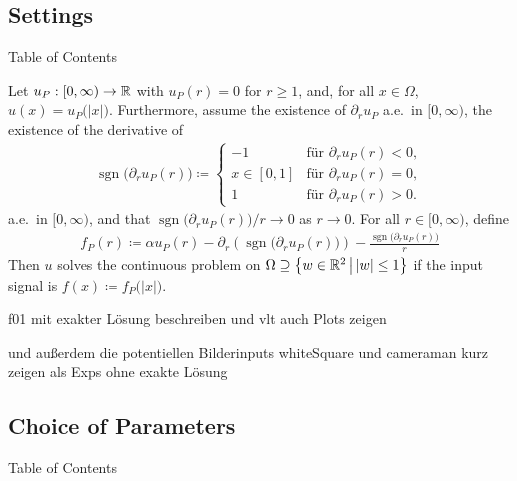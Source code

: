 \subsection{Settings}
\begin{frame}[noframenumbering]{Table of Contents}
\end{frame}

\begin{frame}
Let $u_P:[0,\infty)\to\mathbb{R}$ with $u_P(r)=0$ for $r\geq 1$,
and, for all $x\in\Omega$, $u(x)= u_P\big(|x|\big)$. 
\pause
Furthermore, assume the existence  of $\partial_r u_P$ a.e.\ in $[0,\infty)$,
the existence of the derivative of
\begin{align*}
  \operatorname{sgn}\big(\partial_r u_P(r)\big)
  \coloneqq
  \begin{cases}
    -1 &\text{für }\partial_r u_P(r)<0,\\
    x\in[0,1] &\text{für }\partial_r u_P(r)=0,\\ 
    1 &\text{für }\partial_r u_P(r)>0.
  \end{cases}
\end{align*}
a.e.\ in $[0,\infty)$, and
that $\operatorname{sgn}\big(\partial_r u_P(r)\big)/r\to 0$ as $r\to 0$.
\pause
For all $r\in[0,\infty)$, define 
\begin{align*}
  f_P(r)
  \coloneqq 
  \alpha u_P(r) - \partial_r\left(\operatorname{sgn}\big(\partial_r u_P(r)\big)\right) 
  - \frac{\operatorname{sgn}\big(\partial_r u_P(r)\big)}{r}
\end{align*}
\pause
Then $u$ solves the continuous problem
on $\Omega\supseteq \left\{w\in\mathbb{R}^2\,\middle|\, |w|\leq 1\right\}$ if
the input signal is $f(x)\coloneqq f_P\big(|x|\big)$.
\end{frame}

\begin{frame}
 f01 mit exakter Lösung beschreiben 
 und vlt auch Plots zeigen
\end{frame}

\begin{frame}
  und außerdem
 die potentiellen Bilderinputs whiteSquare und cameraman kurz zeigen als Exps
 ohne exakte Lösung
\end{frame}

\subsection{Choice of Parameters}
\begin{frame}[noframenumbering]{Table of Contents}
\end{frame}

